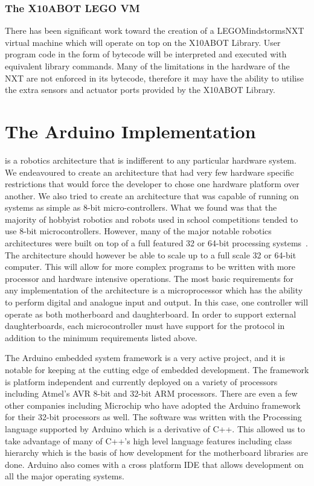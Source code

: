 	\subsubsection{The X10ABOT LEGO VM} %
	\label{ssub:the_x10abot_lego_vm}
	There has been significant work toward the creation of a LEGO\textregistered Mindstorms\textregistered NXT virtual machine which will operate on top on the X10ABOT Library. User program code in the form of bytecode will be interpreted and executed with equivalent library commands. Many of the limitations in the hardware of the NXT are not enforced in its bytecode, therefore it may have the ability to utilise the extra sensors and actuator ports provided by the X10ABOT Library.
	


\section{The Arduino Implementation} %
\label{sec:the_arduino_implementation}
\xten is a robotics architecture that is indifferent to any particular hardware system. We endeavoured to create an architecture that had very few hardware specific restrictions that would force the developer to chose one hardware platform over another. We also tried to create an architecture that was capable of running on systems as simple as 8-bit micro-controllers. What we found was that the majority of hobbyist robotics and robots used in school competitions tended to use 8-bit microcontrollers. However, many of the major notable robotics architectures were built on top of a full featured 32 or 64-bit processing systems~\parencite{Elkady2012}. The architecture should however be able to scale up to a full scale 32 or 64-bit computer. This will allow for more complex programs to be written with more processor and hardware intensive operations. The most basic requirements for any implementation of the \xten architecture is a microprocessor which has the ability to perform digital and analogue input and output. In this case, one controller will operate as both motherboard and daughterboard. In order to support external daughterboards, each microcontroller must have support for the \iic protocol in addition to the minimum requirements listed above.

The Arduino embedded system framework is a very active project, and it is notable for keeping at the cutting edge of embedded development. The framework is platform independent and currently deployed on a variety of processors including Atmel's AVR 8-bit and 32-bit ARM processors. There are even a few other companies including Microchip who have adopted the Arduino framework for their 32-bit processors as well. 
The \xten software was written with the Processing language supported by Arduino which is a derivative of C++. This allowed us to take advantage of many of C++'s high level language features including class hierarchy which is the basis of how development for the motherboard libraries are done. Arduino also comes with a cross platform IDE that allows development on all the major operating systems.

